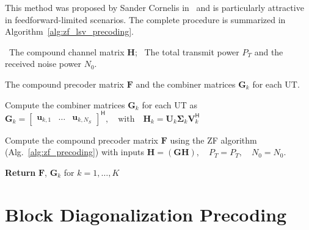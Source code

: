 This method was proposed by Sander Cornelis in~\cite{cornelis_2025} and is particularly attractive in feedforward-limited scenarios.
The complete procedure is summarized in Algorithm~\ref{alg:zf_lsv_precoding}.
\begin{algorithm}[!htbp]
\caption{\ac{ZF} Precoding with Heuristic \acs{LSV} combiner}
\label{alg:zf_lsv_precoding}
\begin{algorithmic}[1]
    
    \Require 
    \Statex \hspace{-\algorithmicindent} \textbullet \, The compound channel matrix $\mathbf{H}$;
    \Statex \hspace{-\algorithmicindent} \textbullet \, The total transmit power $P_T$ and the received noise power $N_0$.
    
    \Ensure  The compound precoder matrix $\mathbf{F}$ and the combiner matrices $\mathbf{G}_k$ for each \ac{UT}.

    \medskip
    \State Compute the combiner matrices $\mathbf{G}_k$ for each \ac{UT} as
    \Statex $\mathbf{G}_k = \begin{bmatrix} \mathbf{u}_{k, 1} & \dots & \mathbf{u}_{k, N_S} \end{bmatrix}^{\mathsf{H}}, \quad \text{with} \quad \mathbf{H}_k = \mathbf{U}_k \mathbf{\Sigma}_k \mathbf{V}^{\mathsf{H}}_k$

    \vspace{0.4\baselineskip}
    \State Compute the compound precoder matrix $\mathbf{F}$ using the \ac{ZF} algorithm (Alg.~\ref{alg:zf_precoding}) with inputs
    \Statex $\mathbf{H} = (\mathbf{G}\mathbf{H}), \quad P_T = P_T, \quad N_0 = N_0.$
    
    \medskip
    \Statex \hspace{-\algorithmicindent}\textbf{Return} \; $\mathbf{F}$, \; $\mathbf{G}_k$ for $k=1, \dots, K$

\end{algorithmic}
\end{algorithm}





\section{Block Diagonalization Precoding}
\label{section:mu_mimo_bd_precoding}

